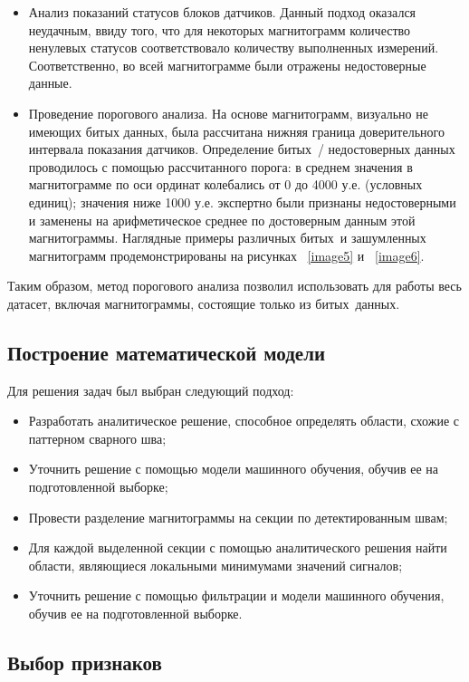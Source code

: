 \documentclass[a4paper,article,14pt]{extarticle}
\begin{document}
\begin{itemize}
    \item Анализ показаний статусов блоков датчиков. Данный подход оказался неудачным, ввиду того, что для некоторых магнитограмм количество ненулевых статусов соответствовало количеству выполненных измерений. Соответственно, во всей магнитограмме были отражены недостоверные данные.
    \item Проведение порогового анализа. На основе магнитограмм, визуально не имеющих битых данных, была рассчитана нижняя граница доверительного интервала показания датчиков. Определение \flqq битых\frqq\, / недостоверных данных проводилось с помощью рассчитанного порога: в среднем значения в магнитограмме по оси ординат колебались от 0 до 4000 у.е. (условных единиц); значения ниже 1000 у.е. экспертно были признаны недостоверными и заменены на арифметическое среднее по достоверным данным этой магнитограммы. Наглядные примеры различных \flqq битых\frqq\, и зашумленных магнитограмм продемонстрированы на рисунках ~\ref{image5} и ~\ref{image6}.
\end{itemize}

Таким образом, метод порогового анализа позволил использовать для работы весь датасет, 
включая магнитограммы, состоящие только из \flqq битых\frqq\, данных. 

\subsection{Построение математической модели}

Для решения задач был выбран следующий подход:
\begin{itemize}
    \item Разработать аналитическое решение, способное определять области, схожие с паттерном сварного шва;
    \item Уточнить решение с помощью модели машинного обучения, обучив ее на подготовленной выборке;
    \item Провести разделение магнитограммы на секции по детектированным швам;
    \item Для каждой выделенной секции с помощью аналитического решения найти области, являющиеся локальными минимумами значений сигналов;
    \item Уточнить решение с помощью фильтрации и модели машинного обучения, обучив ее на подготовленной выборке.
\end{itemize}

\subsection{Выбор признаков}
\end{document}
